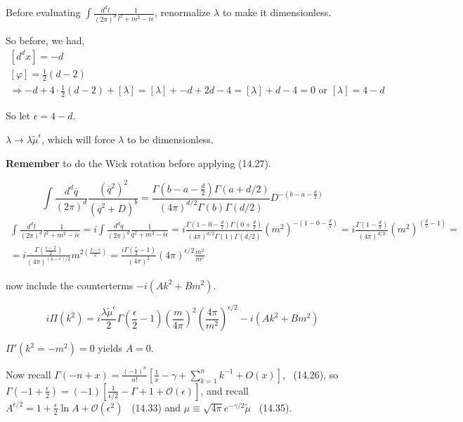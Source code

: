 \documentclass[twoside]{amsart}
\begin{document}
Before evaluating $\int \frac{ d^d l}{ (2\pi)^d} \frac{ 1 }{ l^2 + m^2 - i \epsilon }$, renormalize $\lambda$ to make it dimensionless.  

So before, we had, 
\[
\begin{gathered}
  \left[ d^d x \right] = - d \\ 
  [ \varphi ] = \frac{1}{2} ( d-2) \\ 
  \Longrightarrow - d + 4 \cdot \frac{1}{2} ( d-2) + [ \lambda ] = [ \lambda ] + - d + 2d - 4 = [ \lambda ] + d -4 = 0 \text{ or } [ \lambda ] = 4 - d
\end{gathered}
\]

So let $\epsilon = 4 -d$.  

$\lambda \to \lambda \widetilde{\mu}^{\epsilon}$, which will force $\lambda$ to be dimensionless.  

\textbf{Remember} to do the Wick rotation before applying (14.27).  

\[
\int \frac{ d^d \overline{q}}{ (2\pi)^d} \frac{ ( \overline{q}^2)^2 }{ ( \overline{q}^2 + D )^b} = \frac{ \Gamma(b-a- \frac{d}{2} ) \Gamma(a+ d/2) }{ (4\pi)^{d/2} \Gamma(b) \Gamma(d/2) } D^{ - (b-a-\frac{d}{2} ) }
\]
\[
\begin{gathered}
  \int \frac{ d^d l}{ (2\pi)^d} \frac{1}{ l^2 + m^2 - i \epsilon } = i \int \frac{ d^d q}{ (2\pi)^d} \frac{1}{ q^2 + m^2 - i \epsilon } = i \frac{ \Gamma( 1 - 0 - \frac{d}{2} ) \Gamma( 0 + \frac{d}{2} ) }{ (4\pi)^{d/2} \Gamma(1) \Gamma(d/2) } ( m^2)^{- (1 - 0 - \frac{d}{2} ) } = i \frac{ \Gamma\left( 1 - \frac{d}{2} \right) }{ (4\pi)^{d/2} } (m^2)^{ \left( \frac{d}{2} -1 \right) } = \\ 
   =i \frac{ \Gamma\left( \frac{ \epsilon-2}{2} \right) }{ (4\pi)^{(4-\epsilon)/2} } m^{ 2 \left( \frac{ 2 - \epsilon }{2} \right) }  = \frac{ i \Gamma\left( \frac{ \epsilon}{2} - 1 \right) }{ (4\pi)^2} ( 4\pi)^{\epsilon/2} \frac{ m^2}{ m^{\epsilon }}
\end{gathered}
\]

now include the counterterms $-i (Ak^2 + Bm^2)$.  

\[
i \Pi(k^2) = i \frac{ \lambda \widetilde{\mu}^{\epsilon} }{2} \Gamma\left( \frac{ \epsilon}{2} - 1 \right) \left( \frac{ m}{4\pi} \right)^2 \left( \frac{ 4\pi }{ m^2 } \right)^{\epsilon/2} -i ( Ak^2 + Bm^2)
\]

$\Pi'(k^2 = - m^2) = 0$ yields $A=0$.  

\noindent Now recall $\Gamma(-n +x ) = \frac{ (-1)^n}{n!} \left[ \frac{1}{x} - \gamma + \sum_{k=1}^n k^{-1} + O(x) \right]$, \quad \, (14.26), so \\ 
\phantom{Now recall} $\Gamma(-1 + \frac{ \epsilon}{2} ) = (-1) \left[ \frac{1}{\epsilon/2} - \Gamma + 1 + \mathcal{O}(\epsilon) \right]$,
and recall $A^{\epsilon/2} = 1 + \frac{\epsilon}{2} \ln{A} + \mathcal{O}(\epsilon^2)$ \quad \, (14.33) and $\mu \equiv \sqrt{ 4\pi} e^{-\gamma/2} \widetilde{\mu}$  \quad \, (14.35).  
\end{document}
